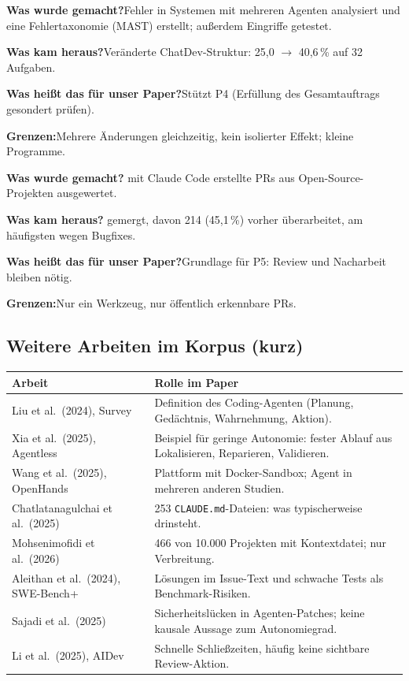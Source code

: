 \documentclass[11pt,a4paper,parskip=half]{scrartcl}
\newcommand{\studie}[6]{%
\begin{tcolorbox}[colback=white,colframe=akzent!50,arc=2pt,boxrule=0.6pt,
  title={\textbf{#1}\hfill\small #2},fonttitle=\color{white},colbacktitle=akzent!80]
\textbf{Was wurde gemacht?}\enskip #3\par
\textbf{Was kam heraus?}\enskip #4\par
\textbf{Was heißt das für unser Paper?}\enskip #5\par
\textbf{Grenzen:}\enskip #6
\end{tcolorbox}}
\begin{document}
\studie{Cemri et al. (2025): \enquote{Why do multi-agent LLM systems fail?}}{NeurIPS, Datasets \& Benchmarks}
{Fehler in Systemen mit mehreren Agenten analysiert und eine Fehlertaxonomie (MAST) erstellt; außerdem Eingriffe getestet.}
{Veränderte ChatDev-Struktur: 25,0 \(\rightarrow\) 40,6\,\% auf 32 Aufgaben.}
{Stützt P4 (Erfüllung des Gesamtauftrags gesondert prüfen).}
{Mehrere Änderungen gleichzeitig, kein isolierter Effekt; kleine Programme.}

\studie{Watanabe et al. (2026): Claude-Code-PRs auf GitHub}{ACM TOSEM}
{567 mit Claude Code erstellte PRs aus Open-Source-Projekten ausgewertet.}
{475 gemergt, davon 214 (45,1\,\%) vorher überarbeitet, am häufigsten wegen Bugfixes.}
{Grundlage für P5: Review und Nacharbeit bleiben nötig.}
{Nur ein Werkzeug, nur öffentlich erkennbare PRs.}

\subsection{Weitere Arbeiten im Korpus (kurz)}
\begin{tabularx}{\textwidth}{@{}p{3.8cm}L@{}}
\toprule
\textbf{Arbeit} & \textbf{Rolle im Paper} \\
\midrule
Liu et al.\ (2024), Survey & Definition des Coding-Agenten (Planung, Gedächtnis, Wahrnehmung, Aktion). \\
Xia et al.\ (2025), Agentless & Beispiel für geringe Autonomie: fester Ablauf aus Lokalisieren, Reparieren, Validieren. \\
Wang et al.\ (2025), OpenHands & Plattform mit Docker-Sandbox; Agent in mehreren anderen Studien. \\
Chatlatanagulchai et al.\ (2025) & 253 \texttt{CLAUDE.md}-Dateien: was typischerweise drinsteht. \\
Mohsenimofidi et al.\ (2026) & 466 von 10.000 Projekten mit Kontextdatei; nur Verbreitung. \\
Aleithan et al.\ (2024), SWE-Bench+ & Lösungen im Issue-Text und schwache Tests als Benchmark-Risiken. \\
Sajadi et al.\ (2025) & Sicherheitslücken in Agenten-Patches; keine kausale Aussage zum Autonomiegrad. \\
Li et al.\ (2025), AIDev & Schnelle Schließzeiten, häufig keine sichtbare Review-Aktion. \\
\bottomrule
\end{tabularx}

\end{document}
